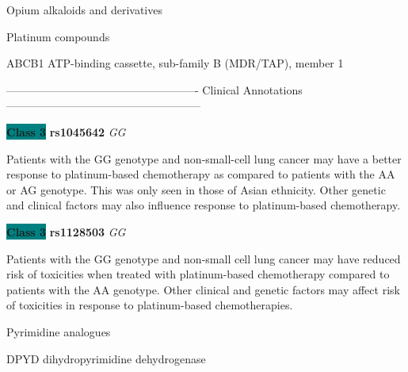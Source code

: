 \documentclass{resume} %
\begin{document}
\begin{rSection}{ Opium alkaloids and derivatives }
\end{rSection}\begin{rSection}{ Platinum compounds }
\item[]

\begin{rSubsection}{ ABCB1 }{ ATP-binding cassette, sub-family B (MDR/TAP), member 1 }{}{}
\item[]

\item[] ---------------------------------------------------- Clinical Annotations -----------------------------------------------------\newline
\item \textbf{\colorbox{teal} {Class 3}} \textbf{ rs1045642 } \textit{ GG }
\item[] Patients with the GG genotype and non-small-cell lung cancer may have a better response to platinum-based chemotherapy as compared to patients with the AA or AG genotype. This was only seen in those of Asian ethnicity. Other genetic and clinical factors may also influence response to platinum-based chemotherapy.\item \textbf{\colorbox{teal} {Class 3}} \textbf{ rs1128503 } \textit{ GG }
\item[] Patients with the GG genotype and non-small cell lung cancer may have reduced risk of toxicities when treated with platinum-based chemotherapy compared to patients with the AA genotype. Other clinical and genetic factors may affect risk of toxicities in response to platinum-based chemotherapies.
\end{rSubsection}

\end{rSection}\begin{rSection}{ Pyrimidine analogues }
\item[]

\begin{rSubsection}{ DPYD }{ dihydropyrimidine dehydrogenase }{}{}
\item[]


\end{rSubsection}
\end{rSection}
\end{document}
